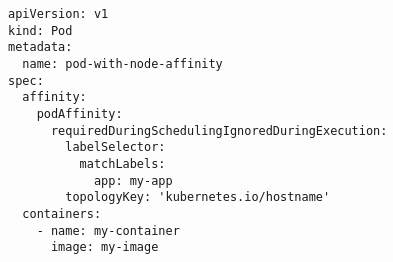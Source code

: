 \begin{verbatim}
apiVersion: v1
kind: Pod
metadata:
  name: pod-with-node-affinity
spec:
  affinity:
    podAffinity:
      requiredDuringSchedulingIgnoredDuringExecution:
        labelSelector:
          matchLabels:
            app: my-app
        topologyKey: 'kubernetes.io/hostname'
  containers:
    - name: my-container
      image: my-image
\end{verbatim}